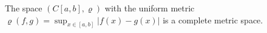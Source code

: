 The space $(C[a,b], \varrho)$ with the uniform metric $\varrho(f,g) = \sup_{x \in [a,b]} |f(x) - g(x)|$ is a complete metric space.
